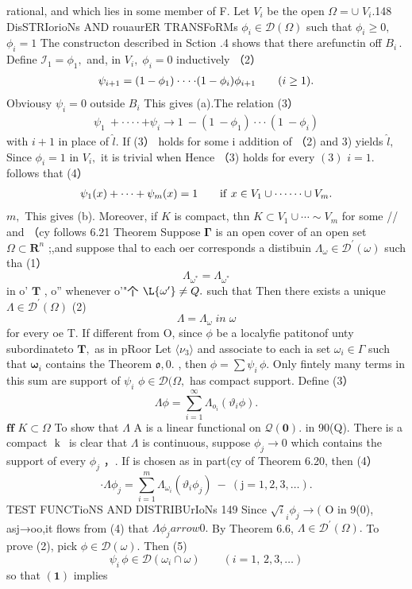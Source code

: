 rational, and which lies in some member of F. Let $V_{i}$ be the open $\Omega=\cup\;V_{i}.$148 DisSTRIorioNs AND rouaurER TRANSFoRMs $\phi_{i}\in{\mathcal{D}}(\Omega)$ such that $\phi_{i}\geq0,$ $\phi_{i}=1$ The constructon described in Sction .4 shows that there arefunctin off $\textstyle B_{i}\,.$ Define ${\mathit{\mathcal{I}}_{1}}=\phi_{1},$ and, in $V_{i},\;\phi_{i}=0$ inductively （2） $$ \begin{array}{c c c}{{\psi_{i+1}=(1-\phi_{1})\cdot\cdot\cdot\cdot(1-\phi_{i})\phi_{i+1}}}&{{}}&{{(i\geq1).}}\end{array} $$ Obviousy $\textstyle\psi_{i}=0$ outside $B_{i}$ This gives (a).The relation (3） $$ \begin{array}{c}{{\psi_{1}\ +\cdot\cdot\cdot\cdot+\psi_{i}\longrightarrow1\ -(1\ -\phi_{1})\cdot\cdot\cdot(1\ -\phi_{i})}}\end{array} $$ with $i+1$ in place of ${\hat{l}}.$ If (3） holds for some i addition of （2) and 3) yields ${\hat{l}},$ Since $\phi_{i}=1$ in $V_{i},$ it is trivial when Hence （3) holds for every $\left(3\right)$ $i=1.$ follows that (4） $$ \begin{array}{c c c}{{\psi_{1}(x)+\cdots+\psi_{m}(x)=1~~~}}&{{\mathrm{if~}x\in V_{1}\cup\cdots\cdots\cup V_{m}.}}\end{array} $$ $m,$ This gives (b). Moreover, if $\textstyle K$ is compact, thn $K\subset V_{1}\cup\cdots\sim V_{m}$ for some // and （cy follows 6.21 Theorem Suppose ${\boldsymbol{\Gamma}}$ is an open cover of an open set $\Omega\subset{\boldsymbol{R}}^{n}$ ;,and suppose thal to each oer corresponds a distibuin $\Lambda_{\omega}\in{\mathcal{D}}^{\prime}(\omega)$ such tha (1） $$ \Lambda_{\omega^{\ast}}=\Lambda_{\omega^{\ast}} $$ in o’ ${\mathbf{T}}$ , o” whenever o'"个 $\L{\omega^{\prime}}\neq Q.$ such that Then there exists a unique $\Lambda\in{\mathcal{D}}^{\prime}(\Omega)$ (2) $$ \Lambda=\Lambda_{\omega}\;i n\;\omega $$ for every oe T. If different from O, since $\phi$ be a localyfie patitonof unty subordinateto $\mathbf{T},$ as in pRoor Let $\langle\nu_{3}\rangle$ and associate to each ia set $\omega_{i}\in\Gamma$ such that ${\boldsymbol{\omega}}_{i}$ contains the Theorem ${\mathfrak{o}},\scriptstyle0.$ , then $\phi=\sum\psi_{i}\,\phi.$ Only fintely many terms in this sum are support of $\textstyle\psi_{i}$ $\phi\in{\mathcal{D}}(\Omega,$ has compact support. Define (3） $$ \Lambda\phi=\sum_{i=1}^{\infty}\Lambda_{o_{i}}(\vartheta_{i}\phi). $$ $\mathbf{f}\mathbf{f}$ $K\subset\Omega$ To show that $\Lambda$ A is a linear functional on ${\mathcal{Q}}(\mathbf{0}).$ in 90(Q). There is a compact $\mathrm{\boldmath~k~}$ is clear that $\Lambda$ is continuous, suppose $\phi_{j}\to0$ which contains the support of every $\phi_{j}$ ，. If is chosen as in part(cy of Theorem 6.20, then (4） $$ \cdot\Lambda\phi_{j}=\sum_{i=1}^{m}\Lambda_{\omega_{i}}(\vartheta_{i}\phi_{j})\mathrm{~-~(j=1,2,3,\ldots).} $$TEST FUNCTioNS AND DISTRIBUrIoNs 149 Since ${\sqrt{i}}_{i}\phi_{j}\to($ O in 9(0), asj→oo,it flows from (4) that $\Lambda\phi_{j} arrow0.$ By Theorem 6.6, $\Lambda\in{\mathcal{D}}^{\prime}(\Omega).$ To prove (2), pick $\phi\in{\mathcal{D}}(\omega).$ Then (5) $$ \psi_{i}\,\phi\in{\mathcal D}(\omega_{i}\cap\omega)\qquad(i=1,\,2,3,\dots) $$ so that $\mathbf{(1)}$ implies 